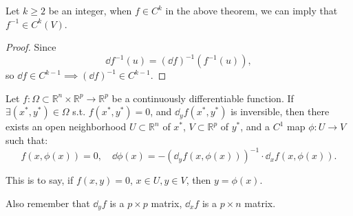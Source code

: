 \begin{corollary}
    Let $k\ge 2$ be an integer, when $f\in C^k$ in the above theorem,
	we can imply that $f^{-1}\in C^k(V)$.
\end{corollary}
\begin{proof}[Proof]
	Since
    \[
	\dd f^{-1}(u) = (\dd f)^{-1} (f^{-1} (u)),
	\]
	so $\dd f\in C^{k-1}\implies (\dd f)^{-1} \in C^{k-1}$.
\end{proof}

\begin{theorem}
    Let $f: \Omega \subset \mathbb{R}^n\times \mathbb{R}^p \to \mathbb{R}^p$ be
	a continuously differentiable function.
	If $\exists (x^*, y^*)\in \Omega$ s.t. $f(x^*, y^*) = 0$, and
	$\dd_y f(x^*, y^*)$ is inversible, then there exists an open
	neighborhood $U \subset \mathbb{R}^n$ of $x^*$,
	$V \subset \mathbb{R}^p$ of $y^*$, and a $C^1$ map $\phi: U\to V$ such
	that:
	\[
	f(x, \phi(x)) = 0,\quad \dd \phi(x) = -(\dd_y f(x, \phi(x)))^{-1}\cdot
	\dd_x f(x, \phi(x)).
	\]
\end{theorem}
\begin{remark}
    This is to say, if $f(x,y) = 0$, $x\in U, y\in V$, then $y = \phi(x)$.

	Also remember that $\dd_y f$ is a $p \times p$ matrix,
	$\dd_x f$ is a $p \times  n$ matrix.
\end{remark}
